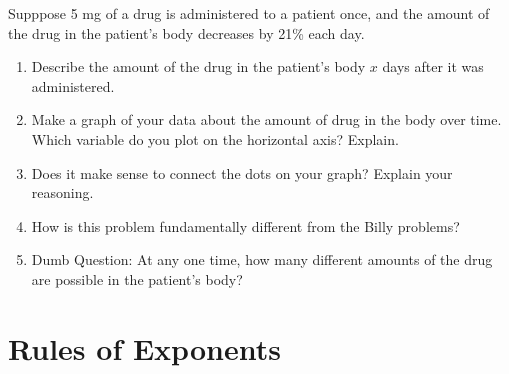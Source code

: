 \documentclass[justified,openany,nofonts]{tufte-book}
\begin{document}
\begin{prob}
Supppose 5 mg of a drug is administered to a patient once, and the amount of the drug in the patient's body decreases by 21\% each day.  
\begin{enumerate}
\item Describe the amount of the drug in the patient's body $x$ days after it was administered.  
\item Make a graph of your data about the amount of drug in the body over time.  Which variable do you plot on the horizontal axis?  Explain.  
\item Does it make sense to connect the dots on your graph?  Explain your reasoning.  

\item How is this problem fundamentally different from the Billy problems?  
\item Dumb Question:  At any one time, how many different amounts of the drug are possible in the patient's body?
\end{enumerate}
\end{prob}

\newpage
\section{Rules of Exponents}\label{A:ExponentRules}
\end{document}
